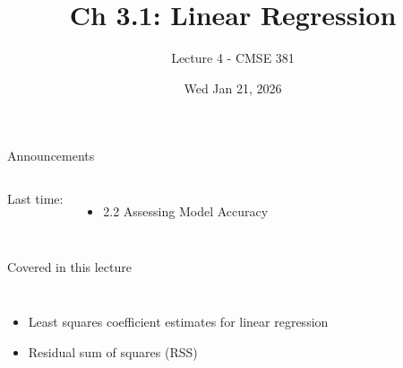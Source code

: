 \documentclass[aspectratio=169,usenames,dvipsnames]{beamer}
\begin{document}
\title[]{Ch 3.1: Linear Regression}
\subtitle{Lecture 4 - CMSE 381}
\date{Wed Jan 21, 2026}





\begin{frame}
 \titlepage


\end{frame}
\begin{frame}[c]{Announcements}

\begin{columns}
\centering

	Last time:
	\begin{itemize}
		\item 2.2 Assessing Model Accuracy
	\end{itemize}
\centering

\end{columns}

\end{frame}
\begin{frame}[c]{Covered in this lecture }

\begin{columns}
\centering
\begin{itemize}
	\item Least squares coefficient estimates for linear regression
	\item Residual sum of squares (RSS)
\end{itemize}
\centering

\end{columns}

\end{frame}
\end{document}
